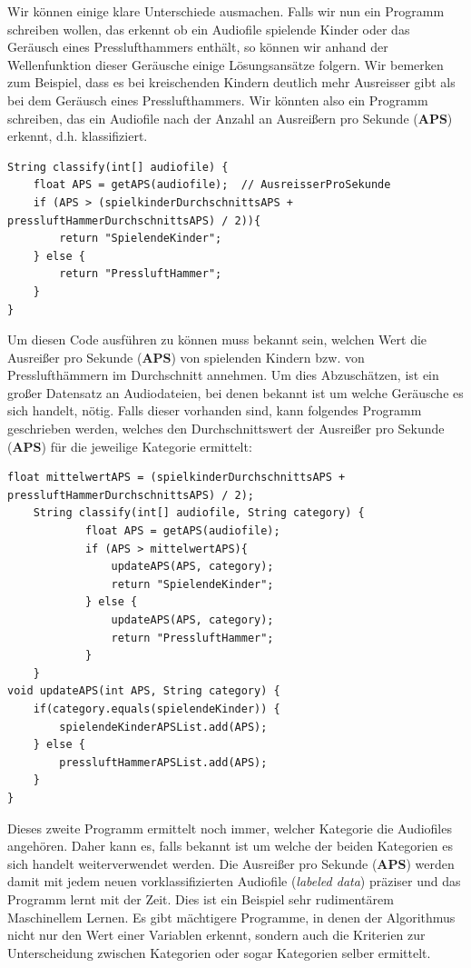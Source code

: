 \documentclass{thesisclass}
\begin{document}
Wir können einige klare Unterschiede ausmachen. Falls wir nun ein Programm schreiben wollen, das erkennt ob ein Audiofile spielende Kinder oder das Geräusch eines Presslufthammers enthält, so können wir anhand der Wellenfunktion dieser Geräusche einige Lösungsansätze folgern. Wir bemerken zum Beispiel, dass es bei kreischenden Kindern deutlich mehr \gls{Ausreisser} gibt als bei dem Geräusch eines Presslufthammers. Wir könnten also ein Programm schreiben, das ein Audiofile nach der Anzahl an Ausreißern pro Sekunde (\textbf{APS}) erkennt, d.h. klassifiziert.

\begin{lstlisting}
String classify(int[] audiofile) {
   	float APS = getAPS(audiofile); 	// AusreisserProSekunde
	if (APS > (spielkinderDurchschnittsAPS + pressluftHammerDurchschnittsAPS) / 2)){
		return "SpielendeKinder";
	} else {
		return "PressluftHammer";
	}
}
\end{lstlisting}

Um diesen Code ausführen zu können muss bekannt sein, welchen Wert die Ausreißer pro Sekunde (\textbf{APS}) von spielenden Kindern bzw. von Presslufthämmern im Durchschnitt annehmen. Um dies Abzuschätzen, ist ein großer Datensatz an Audiodateien, bei denen bekannt ist um welche Geräusche es sich handelt, nötig. Falls dieser vorhanden sind, kann folgendes Programm geschrieben werden, welches den Durchschnittswert der Ausreißer pro Sekunde  (\textbf{APS}) für die jeweilige Kategorie ermittelt:
\clearpage

\begin{lstlisting}
float mittelwertAPS = (spielkinderDurchschnittsAPS + pressluftHammerDurchschnittsAPS) / 2);
    String classify(int[] audiofile, String category) {
        	float APS = getAPS(audiofile);
			if (APS > mittelwertAPS){
				updateAPS(APS, category);		
				return "SpielendeKinder";
			} else {
				updateAPS(APS, category);
				return "PressluftHammer";
			}
    }   
void updateAPS(int APS, String category) {
	if(category.equals(spielendeKinder)) {
		spielendeKinderAPSList.add(APS);
	} else {
		pressluftHammerAPSList.add(APS);
	}
}
\end{lstlisting}

Dieses zweite Programm ermittelt noch immer, welcher Kategorie die Audiofiles angehören. Daher kann es, falls bekannt ist um welche der beiden Kategorien es sich handelt weiterverwendet werden. Die Ausreißer pro Sekunde (\textbf{APS}) werden damit mit jedem neuen vorklassifizierten Audiofile (\textit{labeled data}) präziser und das Programm lernt mit der Zeit. Dies ist ein Beispiel sehr rudimentärem Maschinellem Lernen.\newline
Es gibt mächtigere Programme, in denen der Algorithmus nicht nur den Wert einer Variablen erkennt, sondern auch die Kriterien zur Unterscheidung zwischen Kategorien oder sogar Kategorien selber ermittelt.
\end{document}
